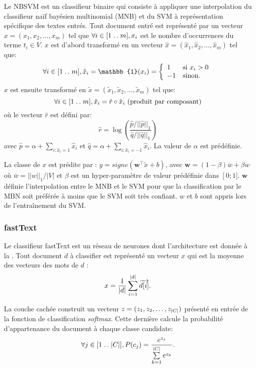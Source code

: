 Le NBSVM \citep{wang2012nbsvm} est un classifieur binaire qui consiste à appliquer une interpolation du classifieur naïf bayésien multinomial (MNB) et du SVM à représentation spécifique des textes entrés. Tout document entré est représenté par un vecteur $x=(x_1, x_2, \dots, x_m)$ tel que $\forall i \in [1 \mathrel{{.}\,{.}}\nobreak m], x_i$ est le nombre d'occurrences du terme $t_i \in V$.  $x$ est d'abord transformé en un vecteur $\hat{x}=(\hat{x}_1, \hat{x}_2, \dots, \hat{x}_m)$ tel que: 
\[\forall i \in [1 \twodots m], \hat{x}_i = \mathbb{1}(x_i) = \left\lbrace \begin{array}{ll}
1 & \text{si } x_i > 0 \\
-1 & \text{sinon.}
\end{array} \right.\]  $\hat{x}$ est ensuite transformé en  $\tilde{x}=(\tilde{x}_1, \tilde{x}_2, \dots, \tilde{x}_m)$ tel que: 
\[\forall i \in [1 \mathrel{{.}\,{.}}\nobreak m], \tilde{x}_i = \hat{r} \circ \hat{x}_i\text{  (produit par composant)} \]
où le vecteur $\hat{r}$ est défini par: \[\hat{r}=\log \left(\frac{\hat{p}/\vert\vert \hat{p} \vert\vert_1}{\hat{q} / \vert\vert \hat{q} \vert\vert_1}\right)\] avec $\hat{p}=\alpha + \sum\limits_{i:\hat{x}_i=1}\hat{x}_i$ et $\hat{q}=\alpha + \sum\limits_{i:\hat{x}_i=-1}\hat{x}_i$. La valeur de $\alpha$ est prédéfinie.

 La classe de $x$ est prédite par : $y = signe(\mathbf{w}^\top\tilde{x} + b)$, avec $\mathbf{w} = (1 - \beta) \overline{w} + \beta w$ où $\overline{w} = \vert\vert w\vert\vert_1 / \vert V \vert$ et $\beta$ est un hyper-paramètre de valeur prédéfinie dans $\left[0; 1] \right.$. $\mathbf{w}$ définie l'interpolation entre le MNB et le SVM pour que la classification par le MBN soit préférée à moins que le SVM soit très confiant. $w$ et $b$ sont appris lors de l'entraînement du SVM.
 

\subsubsection{fastText}
 Le classifieur fastText \citep{grave2017fasttextcls} est un réseau de neurones dont l'architecture est donnée à la  \citep{zolotov2017analysisOffastText}. Tout document $d$ à classifier est représenté un vecteur $x$ qui est la moyenne des vecteurs des mots de $d$ \citep{zolotov2017analysisOffastText}: \[x = \frac{1}{{\vert d\vert}} \sum\limits_{i = 1}^{{\vert d\vert}} \overrightarrow{d[i]}.\]
 
 
 La couche cachée construit un vecteur $z = (z_1, z_2, \dots, z_{\vert C\vert})$ présenté en entrée de la fonction de classification \textit{softmax}. Cette dernière calcule la probabilité d'appartenance du document à chaque classe candidate:
 \[\forall j\in [1\mathrel{{.}\,{.}}\nobreak{\vert C\vert}], P(c_j) = \frac{e^{z_j}}{\sum\limits_{k=1}^{\vert C\vert} e^{z_k}}.\]
 

